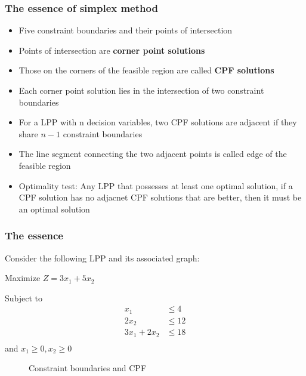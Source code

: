 \documentclass[12pt]{article}
\begin{document}
\subsubsection*{The essence of simplex method}
\begin{itemize}
\item Five constraint boundaries and their points of intersection
\item Points of intersection are \textbf{corner point solutions}
\item Those on the corners of the feasible region are called \textbf{CPF solutions}
\item Each corner point solution lies in the intersection of two constraint boundaries
\item For a LPP with n decision variables, two CPF solutions are adjacent if they share $n-1$ constraint boundaries
\item The line segment connecting the two adjacent points is called edge of the feasible region
\item Optimality test: Any LPP that possesses at least one optimal solution, if a CPF solution has no adjacnet CPF solutions 
that are better, then it must be an optimal solution
\end{itemize}

  \subsubsection*{The essence}
Consider the following LPP and its associated graph:

Maximize $Z=3 x_1 + 5 x_2$

Subject to 
\begin{align*}
x_1           & \le 4  \\
2 x_2         & \le 12 \\
3 x_1 + 2 x_2 & \le 18 \\
\end{align*}
and 
$x_1 \ge 0, x_2 \ge 0$

  \begin{figure}[h]
    \centering
{}
    \caption{Constraint boundaries and CPF}
  \end{figure}
\end{document}
